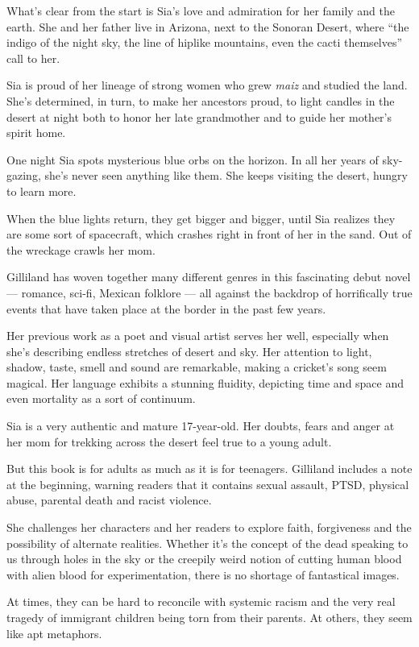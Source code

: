 What's clear from the start is Sia's love and admiration for her family
and the earth. She and her father live in Arizona, next to the Sonoran
Desert, where ``the indigo of the night sky, the line of hiplike
mountains, even the cacti themselves'' call to her.

Sia is proud of her lineage of strong women who grew \emph{maiz} and
studied the land. She's determined, in turn, to make her ancestors
proud, to light candles in the desert at night both to honor her late
grandmother and to guide her mother's spirit home.

One night Sia spots mysterious blue orbs on the horizon. In all her
years of sky-gazing, she's never seen anything like them. She keeps
visiting the desert, hungry to learn more.

When the blue lights return, they get bigger and bigger, until Sia
realizes they are some sort of spacecraft, which crashes right in front
of her in the sand. Out of the wreckage crawls her mom.

Gilliland has woven together many different genres in this fascinating
debut novel --- romance, sci-fi, Mexican folklore --- all against the
backdrop of horrifically true events that have taken place at the border
in the past few years.

Her previous work as a poet and visual artist serves her well,
especially when she's describing endless stretches of desert and sky.
Her attention to light, shadow, taste, smell and sound are remarkable,
making a cricket's song seem magical. Her language exhibits a stunning
fluidity, depicting time and space and even mortality as a sort of
continuum.

Sia is a very authentic and mature 17-year-old. Her doubts, fears and
anger at her mom for trekking across the desert feel true to a young
adult.

But this book is for adults as much as it is for teenagers. Gilliland
includes a note at the beginning, warning readers that it contains
sexual assault, PTSD, physical abuse, parental death and racist
violence.

She challenges her characters and her readers to explore faith,
forgiveness and the possibility of alternate realities. Whether it's the
concept of the dead speaking to us through holes in the sky or the
creepily weird notion of cutting human blood with alien blood for
experimentation, there is no shortage of fantastical images.

At times, they can be hard to reconcile with systemic racism and the
very real tragedy of immigrant children being torn from their parents.
At others, they seem like apt metaphors.

